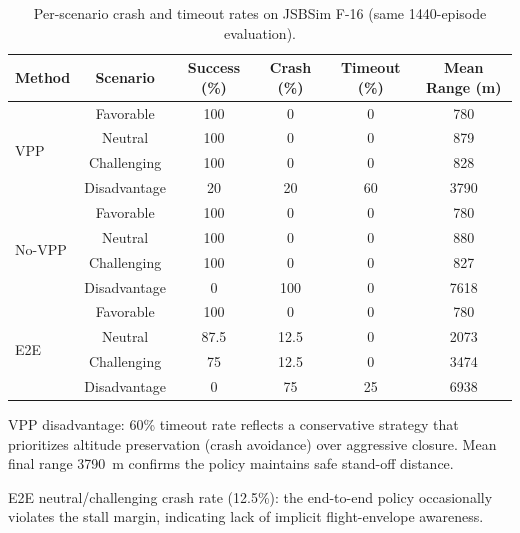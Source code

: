 \begin{table}[t]
\centering
\small
\caption{Per-scenario crash and timeout rates on JSBSim F-16 (same 1440-episode evaluation).}
\label{tab:jsbsim_crash_timeout}
\begin{tabular}{@{}lccccc@{}}
\toprule
Method & Scenario & Success (\%) & Crash (\%) & Timeout (\%) & Mean Range (m) \\
\midrule
\multirow{4}{*}{VPP}
  & Favorable    & 100 & 0   & 0   & 780 \\
  & Neutral      & 100 & 0   & 0   & 879 \\
  & Challenging  & 100 & 0   & 0   & 828 \\
  & Disadvantage & 20  & 20  & 60  & 3790 \\
\midrule
\multirow{4}{*}{No-VPP}
  & Favorable    & 100 & 0   & 0   & 780 \\
  & Neutral      & 100 & 0   & 0   & 880 \\
  & Challenging  & 100 & 0   & 0   & 827 \\
  & Disadvantage & 0   & 100 & 0   & 7618 \\
\midrule
\multirow{4}{*}{E2E}
  & Favorable    & 100 & 0   & 0   & 780 \\
  & Neutral      & 87.5& 12.5& 0   & 2073 \\
  & Challenging  & 75  & 12.5& 0   & 3474 \\
  & Disadvantage & 0   & 75  & 25  & 6938 \\
\bottomrule
\end{tabular}
\begin{tablenotes}
\small
\item VPP disadvantage: 60\% timeout rate reflects a conservative strategy that prioritizes altitude preservation (crash avoidance) over aggressive closure. Mean final range 3790~m confirms the policy maintains safe stand-off distance.
\item E2E neutral/challenging crash rate (12.5\%): the end-to-end policy occasionally violates the stall margin, indicating lack of implicit flight-envelope awareness.
\end{tablenotes}
\end{table}
